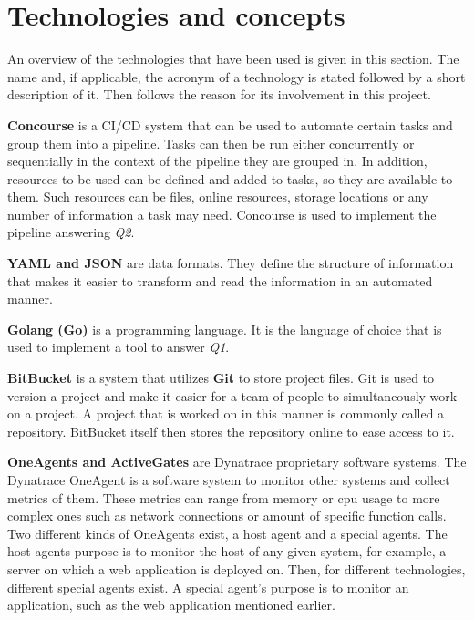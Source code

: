 \chapter{Technologies and concepts}\label{ch:technologies-used}

An overview of the technologies that have been used is given in this section.
The name and, if applicable, the acronym of a technology is stated followed by a short description of it.
Then follows the reason for its involvement in this project.

\textbf{Concourse} is a CI/CD system that can be used to automate certain tasks and group them into a pipeline.
Tasks can then be run either concurrently or sequentially in the context of the pipeline they are grouped in.
In addition, resources to be used can be defined and added to tasks, so they are available to them.
Such resources can be files, online resources, storage locations or any number of information a task may need.
Concourse is used to implement the pipeline answering \textit{Q2}.

\textbf{YAML and JSON} are data formats.
They define the structure of information that makes it easier to transform and read the information in an automated manner.

\textbf{Golang (Go)} is a programming language.
It is the language of choice that is used to implement a tool to answer \textit{Q1}.

\textbf{BitBucket} is a system that utilizes \textbf{Git} to store project files.
Git is used to version a project and make it easier for a team of people to simultaneously work on a project.
A project that is worked on in this manner is commonly called a repository.
BitBucket itself then stores the repository online to ease access to it.

\textbf{OneAgents and ActiveGates} are Dynatrace proprietary software systems.
The Dynatrace OneAgent\cite{oneagents} is a software system to monitor other systems and collect metrics of them.
These metrics can range from memory or cpu usage to more complex ones such as network connections or amount of specific function calls.
Two different kinds of OneAgents exist, a host agent and a special agents.
The host agents purpose is to monitor the host of any given system, for example, a server on which a web application is deployed on.
Then, for different technologies, different special agents exist.
A special agent's purpose is to monitor an application, such as the web application mentioned earlier.

